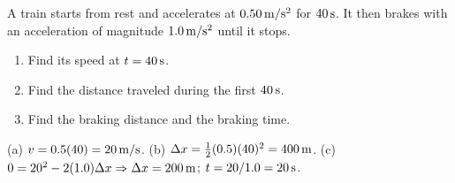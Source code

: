 \begin{exo}{}
A train starts from rest and accelerates at $0.50\,\mathrm{m/s^2}$ for $40\,\mathrm{s}$. It then brakes with an acceleration of magnitude $1.0\,\mathrm{m/s^2}$ until it stops.
\begin{enumerate}[label=(\alph*)]
\item Find its speed at $t=40\,\mathrm{s}$.
\item Find the distance traveled during the first $40\,\mathrm{s}$.
\item Find the braking distance and the braking time.
\end{enumerate}
\work{4.5cm}
\begin{solution}
(a) $v=0.5(40)=20\,\mathrm{m/s}$. \;(b) $\Delta x=\frac12(0.5)(40)^2=400\,\mathrm{m}$. \;(c) $0=20^2-2(1.0)\Delta x\Rightarrow\Delta x=200\,\mathrm{m}$; $t=20/1.0=20\,\mathrm{s}$.
\end{solution}
\end{exo}

